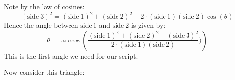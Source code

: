 \documentclass[noauthor,nooutcomes,handout]{ximera}
\begin{document}
\begin{question}
\begin{freeResponse}
\begin{enumerate}
\begin{center}
        \end{center}
        Note by the law of cosines:
        \[
        (\mathrm{side~3})^2 = (\mathrm{side~1})^2 + (\mathrm{side~2})^2 - 2\cdot (\mathrm{side~1})(\mathrm{side~2})\cos(\theta)
        \]
        Hence the angle between $\mathrm{side~1}$ and $\mathrm{side~2}$ is given by:
        \[
        \theta = \arccos\left(\frac{(\mathrm{side~1})^2 + (\mathrm{side~2})^2- (\mathrm{side~3})^2}{2\cdot (\mathrm{side~1})(\mathrm{side~2})})\right) 
        \]
        This is the first angle we need for our script.
        
        Now consider this triangle:
        \begin{center}
\end{center}
\end{enumerate}
\end{freeResponse}
\end{question}
\end{document}
